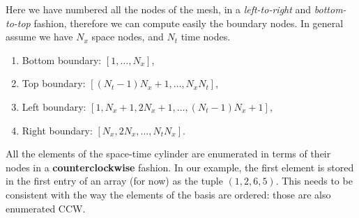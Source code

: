 \documentclass[]{report}
\begin{document}
    Here we have numbered all the nodes of the mesh, in a \textit{left-to-right} and \textit{bottom-to-top} fashion, therefore we can compute easily the boundary nodes. In general assume we have $N_x$ space nodes, and $N_t$ time nodes.
    \begin{enumerate}
        \item Bottom boundary: $[1,\dots,N_x]$,
        \item Top boundary: $[(N_t - 1)N_x + 1, \dots, N_x N_t]$,
        \item Left boundary: $[1, N_x + 1, 2N_x + 1, \dots, (N_t - 1) N_x + 1]$,
        \item Right boundary: $[N_x, 2N_x, \dots, N_t N_x]$.
    \end{enumerate}
    All the elements of the space-time cylinder are enumerated in terms of their nodes in a \textbf{counterclockwise} fashion. In our example, the first element is stored in the first entry of an array (for now) as the tuple $(1,2,6,5)$. This needs to be consistent with the way the elements of the basis are ordered: those are also enumerated CCW.
\end{document}

